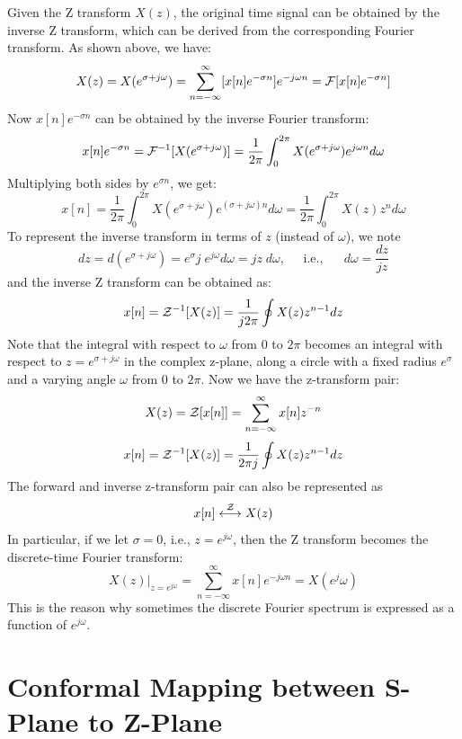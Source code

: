 \documentclass{scrreprt}
\theoremstyle{plain}
\theoremstyle{definition}
\theoremstyle{remark}
\begin{document}
Given the Z transform $X(z)$, the original time signal can be obtained by 
the inverse Z transform, which can be derived from the corresponding Fourier 
transform. As shown above, we have:
\[ X(z)=X(e^{\sigma+j\omega})=\sum_{n=-\infty}^\infty [x[n] e^{-\sigma n}] 
e^{-j\omega n} ={\cal F}[x[n] e^{-\sigma n}]
\]
Now $x[n]e^{-\sigma n}$ can be obtained by the inverse Fourier transform:
\[ x[n] e^{-\sigma n}={\cal F}^{-1}[X(e^{\sigma+j\omega})]
=\frac{1}{2\pi}\int_0^{2\pi} X(e^{\sigma+j\omega}) e^{j\omega n} d\omega
\]
Multiplying both sides by $e^{\sigma n}$, we get:
\[ 
x[n]=\frac{1}{2\pi}\int_0^{2\pi} X(e^{\sigma+j\omega}) e^{(\sigma+j\omega) n} d\omega 
=\frac{1}{2\pi}\int_0^{2\pi} X(z) z^n d\omega 
\]
To represent the inverse transform in terms of $z$ (instead of $\omega$), we note
\[ dz=d(e^{\sigma+j\omega})=e^\sigma j\;e^{j\omega} d\omega=jz\;d\omega,
\;\;\;\;\;\mbox{i.e.,}\;\;\;\;\;\;d\omega=\frac{dz}{jz}	\]
and the inverse Z transform can be obtained as:
\[ x[n]={\cal Z}^{-1}[X(z)]=\frac{1}{j2\pi}\oint X(z) z^{n-1} dz	\]
Note that the integral with respect to $\omega$ from $0$ to $2\pi$ becomes
an integral with respect to $z=e^{\sigma+j\omega}$ in the complex z-plane,
along a circle with a fixed radius $e^\sigma$ and a varying angle $\omega$ 
from $0$ to $2\pi$. Now we have the z-transform pair:
\[	X(z)={\cal Z}[x[n]]=\sum_{n=-\infty}^\infty x[n]z^{-n}	\]
\[	x[n]={\cal Z}^{-1}[X(z)]=\frac{1}{2\pi j}\oint X(z)z^{n-1} dz	\]
The forward and inverse z-transform pair can also be represented as
\[	x[n] \stackrel{ {\cal Z} }{\longleftrightarrow} X(z)	\]
In particular, if we let $\sigma=0$, i.e., $z=e^{j\omega}$, then the Z
transform becomes the discrete-time Fourier transform:
\[ X(z)\bigg|_{z=e^{j\omega}}=\sum_{n=-\infty}^\infty x[n] e^{-j\omega n}=X(e^j\omega) \]
This is the reason why sometimes the discrete Fourier spectrum is expressed 
as a function of $e^{j\omega}$.

\section*{Conformal Mapping between S-Plane to Z-Plane}
\end{document}
